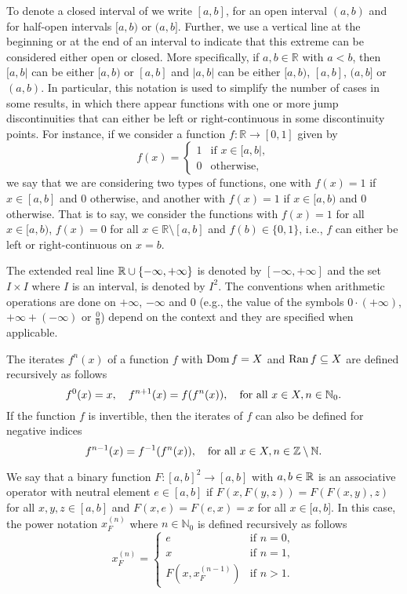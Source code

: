 To denote a closed interval of \RR we write $[a,b]$, for an open interval $(a,b)$ and for half-open intervals $[a,b)$ or $(a,b]$. Further, we use a vertical line at the beginning or at the end of an interval to indicate that this extreme can be considered either open or closed. More specifically, if $a,b \in \mathbb{R}$ with $a<b$, then $[a,b|$ can be either $[a,b)$ or $[a,b]$ and $|a,b|$ can be either $[a,b)$, $[a,b]$, $(a,b]$ or $(a,b)$. In particular, this notation is used to simplify the number of cases in some results, in which there appear functions with one or more jump discontinuities that can either be left or right-continuous in some discontinuity points. For instance, if we consider a function $f:\mathbb{R} \to [0,1]$ given by
$$
f(x)
=\left\{ \begin{array}{ll}
	1 & \text{if } x\in [a,b|,\\
	0 &   \text{otherwise},
\end{array}
\right.
$$
we say that we are considering two types of functions, one with $f(x)=1$ if $x \in[a,b]$ and 0 otherwise, and another with $f(x)=1$ if $x \in[a,b)$ and 0 otherwise. That is to say, we consider the functions with $f(x)=1$ for all $x \in [a,b)$, $f(x)=0$ for all $x \in \mathbb{R} \setminus [a,b]$ and $f(b)\in \{0,1\}$, i.e.,  $f$ can either be left or right-continuous on $x=b$. 

The extended real line $\mathbb{R} \cup \{-\infty,+\infty\}$ is denoted by $[-\infty,+\infty]$ and the set $I \times I$ where $I$ is an interval, is denoted by $I^2$. The conventions when arithmetic operations are done on $+\infty$, $-\infty$ and 0 (e.g., the value of the symbols $0 \cdot (+\infty)$, $+\infty+(-\infty)$ or $\frac{0}{0}$) depend on the context and they are specified when applicable.

The iterates $f^{n}(x)$ of a function $f$ with $\operatorname{Dom} f = X$ and $\operatorname{Ran} f \subseteq X$ are defined recursively as follows
$$f^{0}(x)=x, \quad f^{n+1}(x)=f(f^n(x)), \quad \text{for all } x \in X, n \in \mathbb{N}_0.$$
If the function $f$ is invertible, then the iterates of $f$ can also be defined for negative indices
$$f^{n-1}(x) = f^{-1}(f^{n}(x)), \quad \text{for all } x \in X, n \in \mathbb{Z} \setminus \mathbb{N}.$$

We say that a binary function $F:[a,b]^2 \to [a,b]$ with $a,b \in \mathbb{R}$ is an associative operator with neutral element $e \in [a,b]$ if $F(x,F(y,z))=F(F(x,y),z)$ for all $x,y,z \in [a,b]$ and $F(x,e)=F(e,x)=x$ for all $x \in [a,b$]. In this case, the power notation $x_{F}^{(n)}$ where $n \in \mathbb{N}_0$ is defined recursively as follows 
\begin{equation}\label{eq:powers:genF}
x_{F}^{(n)}= 
\left\{ \begin{array}{ll}
	e &  \text{if } n=0, \\
	x & \text{if }  n=1,\\
	F(x,x_{F}^{(n-1)}) &  \text{if }  n>1.
\end{array}
\right.
\end{equation}

